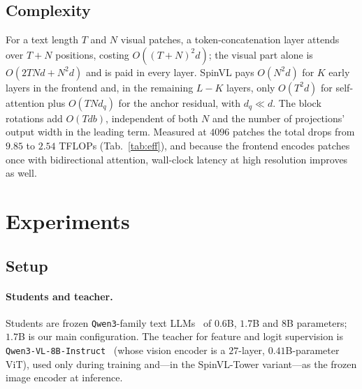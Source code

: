 \documentclass[10pt,twocolumn,letterpaper]{article}
\newcommand{\modelname}{SpinVL}
\begin{document}
\subsection{Complexity}
\label{sec:complexity}

For a text length $T$ and $N$ visual patches, a token-concatenation layer
attends over $T+N$ positions, costing $O((T+N)^2d)$; the visual part alone is
$O(2TNd+N^2d)$ and is paid in every layer. \modelname{} pays $O(N^2d)$ for
$K$ early layers in the frontend and, in the remaining $L-K$ layers, only
$O(T^2d)$ for self-attention plus $O(TN d_q)$ for the anchor residual, with
$d_q\ll d$. The block rotations add $O(Tdb)$, independent of both $N$ and the
number of projections' output width in the leading term. Measured at $4096$
patches the total drops from $9.85$ to $2.54$ TFLOPs
(Tab.~\ref{tab:eff}), and because the frontend encodes patches once with
bidirectional attention, wall-clock latency at high resolution improves as
well.

\section{Experiments}
\label{sec:exp}

\subsection{Setup}
\label{sec:setup}

\paragraph{Students and teacher.}
Students are frozen \texttt{Qwen3}-family text LLMs~\citep{yang2025qwen3} of
$0.6$B, $1.7$B and $8$B parameters; $1.7$B is our main configuration. The
teacher for feature and logit supervision is \texttt{Qwen3-VL-8B-Instruct}~\citep{yang2025qwen3}
(whose vision encoder is a $27$-layer, $0.41$B-parameter ViT), used only during
training and---in the \modelname-Tower variant---as the frozen image encoder at
inference.
\end{document}
